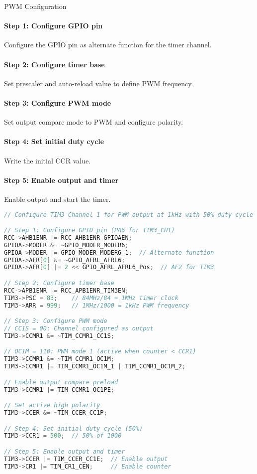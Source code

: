 \begin{KR}{PWM Configuration}
\paragraph{Step 1: Configure GPIO pin}
Configure the GPIO pin as alternate function for the timer channel.
\paragraph{Step 2: Configure timer base}
Set prescaler and auto-reload value to define PWM frequency.
\paragraph{Step 3: Configure PWM mode}
Set output compare mode to PWM and configure polarity.
\paragraph{Step 4: Set initial duty cycle}
Write the initial CCR value.
\paragraph{Step 5: Enable output and timer}
Enable output and start the timer.

\begin{lstlisting}[language=C, style=basesmol]
// Configure TIM3 Channel 1 for PWM output at 1kHz with 50% duty cycle

// Step 1: Configure GPIO pin (PA6 for TIM3_CH1)
RCC->AHB1ENR |= RCC_AHB1ENR_GPIOAEN;
GPIOA->MODER &= ~GPIO_MODER_MODER6;
GPIOA->MODER |= GPIO_MODER_MODER6_1;  // Alternate function
GPIOA->AFR[0] &= ~GPIO_AFRL_AFRL6;
GPIOA->AFR[0] |= 2 << GPIO_AFRL_AFRL6_Pos;  // AF2 for TIM3

// Step 2: Configure timer base
RCC->APB1ENR |= RCC_APB1ENR_TIM3EN;
TIM3->PSC = 83;    // 84MHz/84 = 1MHz timer clock
TIM3->ARR = 999;   // 1MHz/1000 = 1kHz PWM frequency

// Step 3: Configure PWM mode
// CC1S = 00: Channel configured as output
TIM3->CCMR1 &= ~TIM_CCMR1_CC1S;

// OC1M = 110: PWM mode 1 (active when counter < CCR1)
TIM3->CCMR1 &= ~TIM_CCMR1_OC1M;
TIM3->CCMR1 |= TIM_CCMR1_OC1M_1 | TIM_CCMR1_OC1M_2;

// Enable output compare preload
TIM3->CCMR1 |= TIM_CCMR1_OC1PE;

// Set active high polarity
TIM3->CCER &= ~TIM_CCER_CC1P;

// Step 4: Set initial duty cycle (50%)
TIM3->CCR1 = 500;  // 50% of 1000

// Step 5: Enable output and timer
TIM3->CCER |= TIM_CCER_CC1E;  // Enable output
TIM3->CR1 |= TIM_CR1_CEN;     // Enable counter
\end{lstlisting}
\end{KR}

